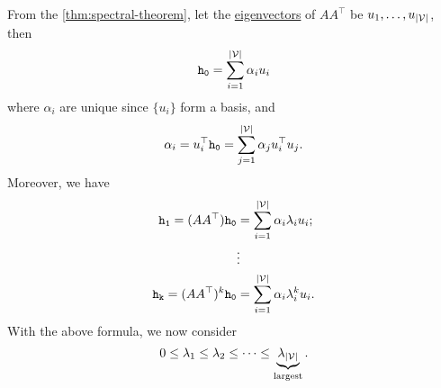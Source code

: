 From the \autoref{thm:spectral-theorem}, let the \hyperref[def:eigenvector]{eigenvectors} of \(A A^{\top} \) be \(u_1, \ldots , u_{\left\vert \mathcal{\MakeUppercase{v}} \right\vert } \), then
\[
	\mathtt{h_0} = \sum\limits_{i=1}^{\left\vert \mathcal{\MakeUppercase{v}} \right\vert } \alpha_i u_{i}
\]
where \(\alpha_{i}\) are unique since \(\{u_{i}\} \) form a basis, and
\[
	\alpha_{i} = u_{i}^{\top}\mathtt{h_0} = \sum\limits_{j=1}^{\left\vert \mathcal{\MakeUppercase{v}} \right\vert } \alpha_{j}u_{i}^{\top}u_{j}.
\]
Moreover, we have
\[
	\begin{split}
		\mathtt{h_1} = (A A^{\top})\mathtt{h_0} &= \sum\limits_{i=1}^{\left\vert \mathcal{\MakeUppercase{v}} \right\vert } \alpha_{i} \lambda_{i}u_{i};\\
		&\vdots\\
		\mathtt{h_k} = (A A^{\top})^k\mathtt{h_0} &= \sum\limits_{i=1}^{\left\vert \mathcal{\MakeUppercase{v}} \right\vert } \alpha_{i} \lambda_{i}^k u_{i}.\\
	\end{split}
\]
With the above formula, we now consider
\[
	0 \leq \lambda_1 \leq \lambda_2 \leq \cdots \leq \underbrace{\lambda_{\left\vert \mathcal{\MakeUppercase{v}} \right\vert}}_{\text{largest}}.
\]
